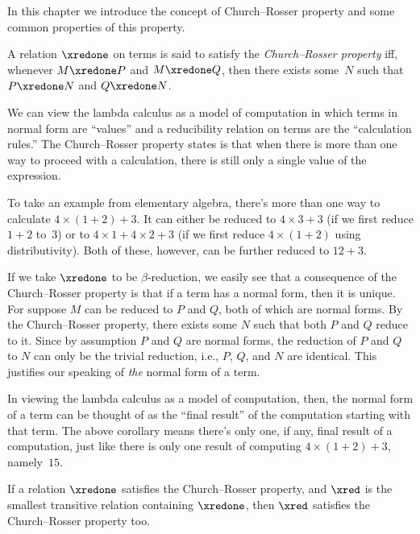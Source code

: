 \documentclass[../../../include/open-logic-section]{subfiles}
\begin{document}

In this chapter we introduce the concept of Church--Rosser property and
some common properties of this property.

\begin{defn} A relation $\xredone$ on
  terms is said to satisfy the \emph{Church--Rosser property} iff,
  whenever $M \xredone P$ and $M \xredone Q$, then there exists
  some~$N$ such that $P \xredone N$ and $Q \xredone N$.
\end{defn}

We can view the lambda calculus as a model of computation in which
terms in normal form are ``values'' and a reducibility relation on
terms are the ``calculation rules.'' The Church--Rosser property states
is that when there is more than one way to proceed with a calculation,
there is still only a single value of the expression.

To take an example from elementary algebra, there's more than one way
to calculate $4 \times (1+2) + 3$. It can either be reduced to $4
\times 3+3$ (if we first reduce $1+2$ to~$3$) or to $4 \times 1+4
\times 2+3$ (if we first reduce $4 \times (1+2)$ using
distributivity). Both of these, however, can be further reduced to
$12+3$.

If we take $\xredone$ to be $\beta$-reduction, we easily see that a
consequence of the Church--Rosser property is that if a term has a
normal form, then it is unique. For suppose $M$ can be reduced to $P$
and $Q$, both of which are normal forms. By the Church--Rosser property,
there exists some $N$ such that both $P$ and $Q$ reduce to it. Since
by assumption $P$ and $Q$ are normal forms, the reduction of $P$ and
$Q$ to $N$ can only be the trivial reduction, i.e., $P$, $Q$, and $N$
are identical. This justifies our speaking of \emph{the} normal form
of a term.

In viewing the lambda calculus as a model of computation, then, the
normal form of a term can be thought of as the ``final result'' of the
computation starting with that term. The above corollary means there's
only one, if any, final result of a computation, just like there is
only one result of computing $4 \times (1+2)+3$, namely~$15$.

\begin{thm} 
  If a relation $\xredone$ satisfies the Church--Rosser property, and $\xred$ is the
  smallest transitive relation containing $\xredone$, then $\xred$ satisfies
  the Church--Rosser property too.
\end{thm}
\end{document}
